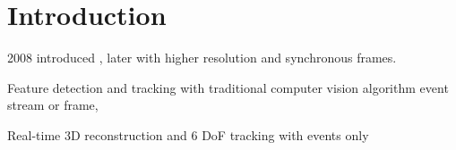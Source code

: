 \chapter{Introduction}
\label{sec:introduction}

2008 introduced \citep{lichtsteiner2008128}, later \citep{brandli2014240} with higher resolution and synchronous frames.


Feature detection and tracking with traditional computer vision algorithm \citep{mueggler2017fast,tedaldi2016feature,zhu2017event} event stream or frame,

Real-time 3D reconstruction and 6 DoF tracking with events only \citep{kim2016real,rebecq2017evo}
